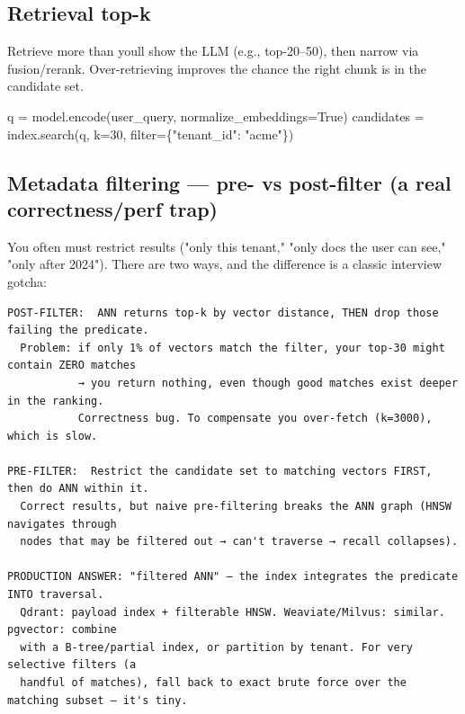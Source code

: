 \documentclass[11pt]{article}
\newenvironment{Shaded}{\begin{snugshade}}{\end{snugshade}}
\newcommand{\BuiltInTok}[1]{\textcolor[rgb]{0.50,0.55,0.55}{#1}}
\newcommand{\DecValTok}[1]{\textcolor[rgb]{0.96,0.45,0.00}{#1}}
\newcommand{\NormalTok}[1]{\textcolor[rgb]{0.81,0.81,0.76}{#1}}
\newcommand{\OperatorTok}[1]{\textcolor[rgb]{0.81,0.81,0.76}{#1}}
\newcommand{\StringTok}[1]{\textcolor[rgb]{0.96,0.31,0.31}{#1}}
\newcommand{\VariableTok}[1]{\textcolor[rgb]{0.15,0.68,0.68}{#1}}
\begin{document}
\subsection{Retrieval top-k}\label{retrieval-top-k}

Retrieve more than you\textquotesingle ll show the LLM (e.g., top-20--50), then narrow via fusion/rerank. Over-retrieving improves the chance the right chunk is in the candidate set.


\begin{Shaded}
\begin{Highlighting}[]
\NormalTok{q }\OperatorTok{=}\NormalTok{ model.encode(user\_query, normalize\_embeddings}\OperatorTok{=}\VariableTok{True}\NormalTok{)}
\NormalTok{candidates }\OperatorTok{=}\NormalTok{ index.search(q, k}\OperatorTok{=}\DecValTok{30}\NormalTok{, }\BuiltInTok{filter}\OperatorTok{=}\NormalTok{\{}\StringTok{"tenant\_id"}\NormalTok{: }\StringTok{"acme"}\NormalTok{\})}
\end{Highlighting}
\end{Shaded}

\subsection{Metadata filtering --- pre- vs post-filter (a real correctness/perf trap)}\label{metadata-filtering--pre--vs-post-filter-a-real-correctnessperf-trap}

You often must restrict results ("only this tenant," "only docs the user can see," "only after 2024"). There are two ways, and the difference is a classic interview gotcha:

\setcodelang{}

\begin{verbatim}
POST-FILTER:  ANN returns top-k by vector distance, THEN drop those failing the predicate.
  Problem: if only 1% of vectors match the filter, your top-30 might contain ZERO matches
           → you return nothing, even though good matches exist deeper in the ranking.
           Correctness bug. To compensate you over-fetch (k=3000), which is slow.

PRE-FILTER:  Restrict the candidate set to matching vectors FIRST, then do ANN within it.
  Correct results, but naive pre-filtering breaks the ANN graph (HNSW navigates through
  nodes that may be filtered out → can't traverse → recall collapses).

PRODUCTION ANSWER: "filtered ANN" — the index integrates the predicate INTO traversal.
  Qdrant: payload index + filterable HNSW. Weaviate/Milvus: similar. pgvector: combine
  with a B-tree/partial index, or partition by tenant. For very selective filters (a
  handful of matches), fall back to exact brute force over the matching subset — it's tiny.
\end{verbatim}
\end{document}
